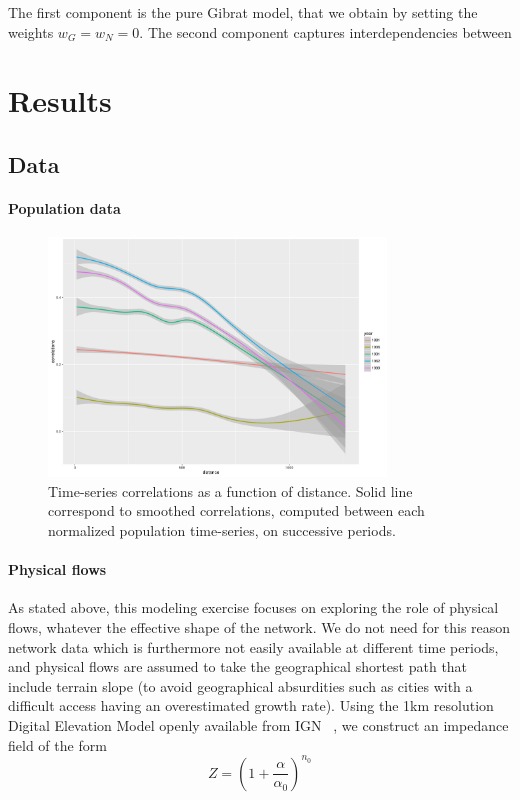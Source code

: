 \documentclass[Royal,sageh,times]{sagej}
\begin{document}
The first component is the pure Gibrat model, that we obtain by setting the weights $w_G = w_N = 0$. The second component captures interdependencies between 






\section{Results}

\subsection{Data}


\paragraph{Population data}



\begin{figure}
\centering
\includegraphics[width=0.8\textwidth]{figures/empirical_tsCorrelations}
\caption{Time-series correlations as a function of distance. Solid line correspond to smoothed correlations, computed between each normalized population time-series, on successive periods.}
\end{figure}


\paragraph{Physical flows}

As stated above, this modeling exercise focuses on exploring the role of physical flows, whatever the effective shape of the network. We do not need for this reason network data which is furthermore not easily available at different time periods, and physical flows are assumed to take the geographical shortest path that include terrain slope (to avoid geographical absurdities such as cities with a difficult access having an overestimated growth rate). Using the 1km resolution Digital Elevation Model openly available from IGN~\cite{}%
, we construct an impedance field of the form
\[
Z = \left(1 + \frac{\alpha}{\alpha_0}\right)^{n_0}
\]
\end{document}
